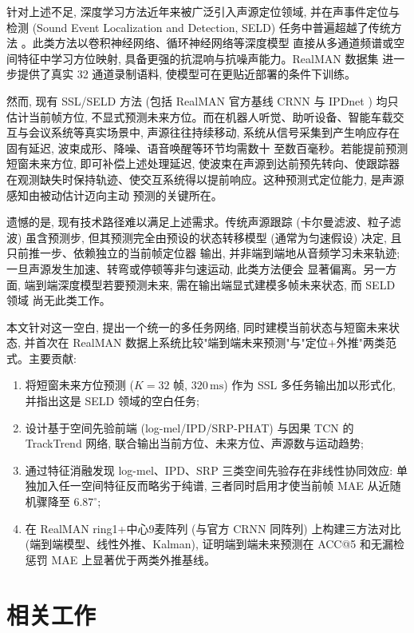 \documentclass[UTF8,a4paper,11pt]{ctexart}
\begin{document}
针对上述不足, 深度学习方法近年来被广泛引入声源定位领域, 并在声事件定位与检测
(Sound Event Localization and Detection, SELD) 任务中普遍超越了传统方法
\cite{adavanne2019seldnet,grumiaux2022survey}。此类方法以卷积神经网络、循环神经网络等深度模型
直接从多通道频谱或空间特征中学习方位映射, 具备更强的抗混响与抗噪声能力。RealMAN 数据集
\cite{yang2024realman} 进一步提供了真实 32 通道录制语料, 使模型可在更贴近部署的条件下训练。

然而, 现有 SSL/SELD 方法 (包括 RealMAN 官方基线 CRNN 与 IPDnet \cite{wang2024ipdnet}) 均只
估计当前帧方位, 不显式预测未来方位。而在机器人听觉、助听设备、智能车载交互与会议系统等真实场景中,
声源往往持续移动, 系统从信号采集到产生响应存在固有延迟, 波束成形、降噪、语音唤醒等环节均需数十
至数百毫秒。若能提前预测短窗未来方位, 即可补偿上述处理延迟, 使波束在声源到达前预先转向、使跟踪器
在观测缺失时保持轨迹、使交互系统得以提前响应。这种预测式定位能力, 是声源感知由被动估计迈向主动
预测的关键所在。

遗憾的是, 现有技术路径难以满足上述需求。传统声源跟踪 (卡尔曼滤波、粒子滤波) 虽含预测步,
但其预测完全由预设的状态转移模型 (通常为匀速假设) 决定, 且只前推一步、依赖独立的当前帧定位器
输出, 并非端到端地从音频学习未来轨迹; 一旦声源发生加速、转弯或停顿等非匀速运动, 此类方法便会
显著偏离。另一方面, 端到端深度模型若要预测未来, 需在输出端显式建模多帧未来状态, 而 SELD 领域
尚无此类工作。

本文针对这一空白, 提出一个统一的多任务网络, 同时建模当前状态与短窗未来状态, 并首次在 RealMAN
数据上系统比较"端到端未来预测"与"定位$+$外推"两类范式。主要贡献:
\begin{enumerate}
  \item 将短窗未来方位预测 ($K{=}32$ 帧, $320\,\mathrm{ms}$) 作为 SSL 多任务输出加以形式化,
        并指出这是 SELD 领域的空白任务;
  \item 设计基于空间先验前端 (log-mel/IPD/SRP-PHAT) 与因果 TCN 的 TrackTrend 网络,
        联合输出当前方位、未来方位、声源数与运动趋势;
  \item 通过特征消融发现 log-mel、IPD、SRP 三类空间先验存在非线性协同效应:
        单独加入任一空间特征反而略劣于纯谱, 三者同时启用才使当前帧 MAE 从近随机骤降至 $6.87^\circ$;
  \item 在 RealMAN ring1+中心9麦阵列 (与官方 CRNN 同阵列) 上构建三方法对比 (端到端模型、线性外推、Kalman),
        证明端到端未来预测在 ACC@5 和无漏检惩罚 MAE 上显著优于两类外推基线。
\end{enumerate}

\section{相关工作}
\end{document}
